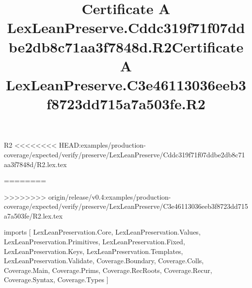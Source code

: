 \begin{lexlean}{R2}
<<<<<<<< HEAD:examples/production-coverage/expected/verify/preserve/LexLeanPreserve/Cddc319f71f07ddbe2db8c71aa3f7848d/R2.lex.tex
\title{Certificate A LexLeanPreserve.Cddc319f71f07ddbe2db8c71aa3f7848d.R2}
========
\title{Certificate A LexLeanPreserve.C3e46113036eeb3f8723dd715a7a503fe.R2}
>>>>>>>> origin/release/v0.4:examples/production-coverage/expected/verify/preserve/LexLeanPreserve/C3e46113036eeb3f8723dd715a7a503fe/R2.lex.tex
\begin{coremodule}
imports [
  LexLeanPreservation.Core,
  LexLeanPreservation.Values,
  LexLeanPreservation.Primitives,
  LexLeanPreservation.Fixed,
  LexLeanPreservation.Keys,
  LexLeanPreservation.Templates,
  LexLeanPreservation.Validate,
  Coverage.Boundary,
  Coverage.Colls,
  Coverage.Main,
  Coverage.Prims,
  Coverage.RecRoots,
  Coverage.Recur,
  Coverage.Syntax,
  Coverage.Types
]


\end{coremodule}
\end{lexlean}

